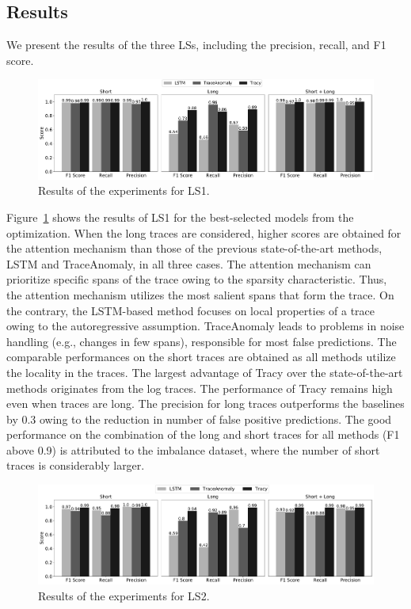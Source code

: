 \subsection{Results}
We present the results of the three LSs, including the precision, recall, and F1 score.

\begin{figure}[!t]
\centering
\includegraphics[width=1.0\textwidth]{gfx/chap6/ls1.pdf}
\caption{Results of the experiments for LS1.}
\label{fig:LS1}
\end{figure}

Figure~\ref{fig:LS1} shows the results of LS1 for the best-selected models from the optimization. When the long traces are considered, higher scores are obtained for the attention mechanism than those of the previous state-of-the-art methods, LSTM and TraceAnomaly, in all three cases. The attention mechanism can prioritize specific spans of the trace owing to the sparsity characteristic. Thus, the attention mechanism utilizes the most salient spans that form the trace. On the contrary, the LSTM-based method focuses on local properties of a trace owing to the autoregressive assumption. TraceAnomaly leads to problems in noise handling (e.g., changes in few spans), responsible for most false predictions. The comparable performances on the short traces are obtained as all methods utilize the locality in the traces. The largest advantage of Tracy over the state-of-the-art methods originates from the log traces. The performance of Tracy remains high even when traces are long. The precision for long traces outperforms the baselines by 0.3 owing to the reduction in number of false positive predictions. The good performance on the combination of the long and short traces for all methods (F1 above 0.9) is attributed to the imbalance dataset, where the number of short traces is considerably larger.

\begin{figure}[!t]
\centering
\includegraphics[width=1.0\textwidth]{gfx/chap6/ls2.pdf}
\caption{Results of the experiments for LS2.}
\label{fig:LS2}
\end{figure}

